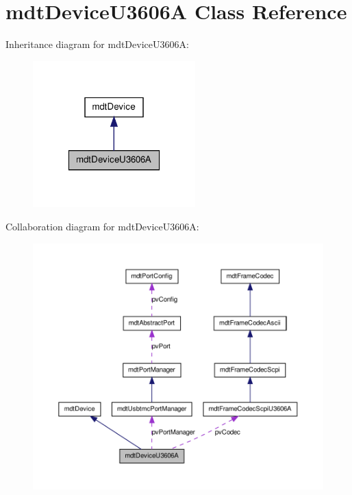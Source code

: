 \hypertarget{classmdt_device_u3606_a}{
\section{mdtDeviceU3606A Class Reference}
\label{classmdt_device_u3606_a}
}


Inheritance diagram for mdtDeviceU3606A:\nopagebreak
\begin{figure}[H]
\begin{center}
\leavevmode
\includegraphics[width=178pt]{classmdt_device_u3606_a__inherit__graph}
\end{center}
\end{figure}


Collaboration diagram for mdtDeviceU3606A:\nopagebreak
\begin{figure}[H]
\begin{center}
\leavevmode
\includegraphics[width=400pt]{classmdt_device_u3606_a__coll__graph}
\end{center}
\end{figure}
